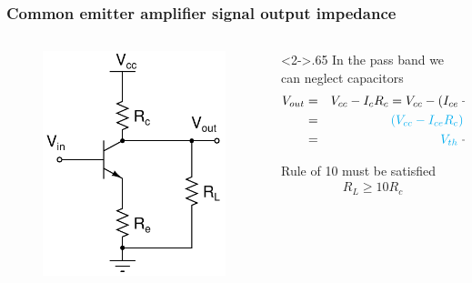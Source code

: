 \documentclass[beamer]{standalone}
\begin{document}
\frame
{ \frametitle{Common emitter  amplifier signal output impedance}
\begin{columns}[c]
 \begin{column}{.35\textwidth}
  \begin{figure}
   \includegraphics[height=0.50\textheight]{./schematics/npn_common_emitter_amplifier}
  \end{figure}
 \end{column}
 \begin{column}<2->{.65\textwidth}
  \pause
  In the pass band we can neglect capacitors
  \begin{eqnarray*}
   V_{out} 
   &=&  V_{cc} - I_c R_c = V_{cc} - (I_{ce} + I_L) R_c \\
   &=&  \textcolor{cyan}{(V_{cc} - I_{ce} R_c)} -I_L \textcolor{teal}{R_c} \\
   &=&  \textcolor{cyan}{V_{th}} - I_L \textcolor{teal}{R_{th}}
  \end{eqnarray*}

  \pause
  \pause
  Rule of 10 must be satisfied
  \begin{eqnarray*}
   R_L \ge 10 R_c
  \end{eqnarray*}
   
 \end{column}
\end{columns}
 
 }
\end{document}
